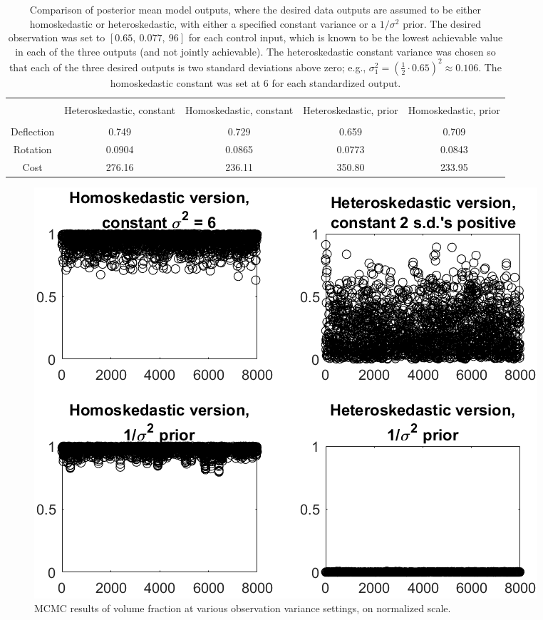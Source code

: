 \documentclass{article}
\begin{document}
\begin{table}[h]
\centering
\begin{tabular}{| c | c  |  c  | c |  c  |}
\hline
 \vspace{-3mm}
& & & & \\
& \parbox{24mm}{\centering Heteroskedastic, constant}& \parbox{24mm}{\centering Homoskedastic, constant}& \parbox{24mm}{\centering Heteroskedastic, prior} & \parbox{24mm}{\centering Homoskedastic, prior}\\
 \vspace{-3.5mm}
& & & & \\
\hline
Deflection & 0.749 & 0.729 & 0.659 & 0.709\\
Rotation & 0.0904 & 0.0865 & 0.0773 & 0.0843\\
Cost & 276.16 & 236.11 & 350.80 & 233.95 \\
\hline
\end{tabular}
\captionsetup{width=.8\linewidth}
\caption{Comparison of posterior mean model outputs, where the desired data outputs are assumed to be either homoskedastic or heteroskedastic, with either a specified constant variance or a $1/\sigma^2$ prior. The desired observation was set to $[0.65,\ 0.077,\ 96]$ for each control input, which is known to be the lowest achievable value in each of the three outputs (and not jointly achievable). The heteroskedastic constant variance was chosen so that each of the three desired outputs is two standard deviations above zero; e.g., $\sigma^2_1 = \left(\frac12\cdot 0.65\right)^2\approx0.106$. The homoskedastic constant was set at 6 for each standardized output.}
\label{table:obs_vvar_comp}
\end{table}

\begin{figure}[h]
\centering
\includegraphics[width=.69\linewidth]{comp_obs_var}
\captionsetup{width=.65\linewidth}
\caption{MCMC results of volume fraction at various observation variance settings, on normalized scale.}
\label{fig:comp_obs_var}
\end{figure}
\end{document}
